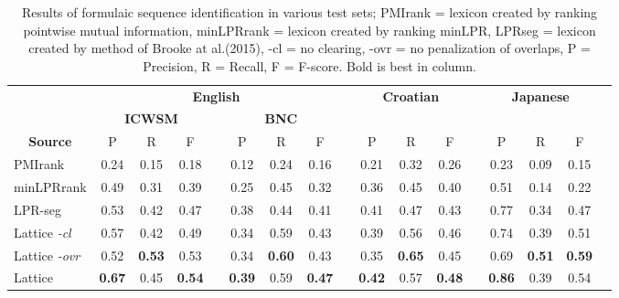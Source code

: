 \documentclass[11pt]{article}
\makeatletter
\def \al {al.\@ }
\makeatother
\begin{document}
 \begin{table}[!bt]
 
 \begin{center}
  \caption{ Results of formulaic sequence identification in various test sets; PMIrank = lexicon created by ranking pointwise mutual information, minLPRrank = lexicon created by ranking minLPR, LPRseg = lexicon created by method of Brooke at \al (2015), -cl = no clearing, -ovr = no penalization of overlaps, P = Precision, R = Recall, F = F-score. Bold is best in column.}
	 \label{tab:main}
 \begin{tabular}{lcccccccccccccccc}

       \hline
        \hline
				& \multicolumn{7}{c}{\bf{English}} & & \multicolumn{3}{c}{\bf{Croatian}} & & \multicolumn{3}{c}{\bf{Japanese}} \\
       \cline{2-9}			
       & \multicolumn{3}{c}{\bf{ICWSM}} & &  \multicolumn{3}{c}{\bf{BNC}} & & &&&  && & \\
       \cline{2-4} \cline{6-8} \cline{10-12} \cline{14-16}
           \multicolumn{1}{c}{\bf{Source}}    & P & R & F &   & P & R & F &   & P & R & F &  & P & R & F \\
            \hline
           \hline     
           
PMIrank & 0.24& 0.15& 0.18 & & 0.12 & 0.24 & 0.16 & & 0.21 &0.32 & 0.26 & & 0.23& 0.09 & 0.15 \\ 
minLPRrank & 0.49& 0.31 & 0.39 & & 0.25& 0.45 & 0.32 & & 0.36 & 0.45 & 0.40 &  & 0.51 & 0.14 & 0.22 \\ 

LPR-seg  &0.53 & 0.42 & 0.47 && 0.38 & 0.44 & 0.41 & & 0.41 & 0.47  & 0.43 &  & 0.77 & 0.34 & 0.47 \\ 
  \hline 

	Lattice \emph{-cl} & 0.57& 0.42 & 0.49 & & 0.34& 0.59 & 0.43 & & 0.39 & 0.56 & 0.46 & & 0.74 & 0.39 & 0.51 \\  	 
			
	Lattice \emph{-ovr} & 0.52& \bf{0.53} & 0.53 & & 0.34& \bf{0.60} & 0.43& & 0.35 & \bf{0.65} & 0.45 & & 0.69 & \bf{0.51} & \bf{0.59} \\  
			
				Lattice & \bf{0.67} & 0.45 & \bf{0.54} & & \bf{0.39}& 0.59 & \bf{0.47} & &\bf{0.42} & 0.57 & \bf{0.48} & & \bf{0.86} & 0.39 & 0.54 \\ 
            \hline
           \hline                  

 \end{tabular}

 \end{center}


 \end{table}
\end{document}
